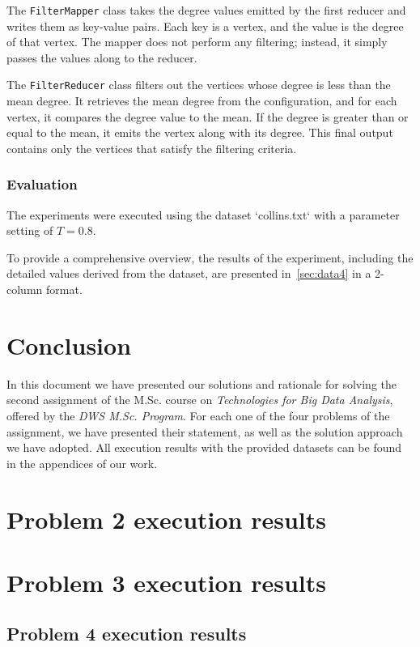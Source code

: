 \documentclass[acmlarge]{acmart}
\begin{document}
The \texttt{FilterMapper} class takes the degree values emitted by the first reducer and writes them as key-value pairs.
Each key is a vertex, and the value is the degree of that vertex.
The mapper does not perform any filtering; instead, it simply passes the values along to the reducer.

The \texttt{FilterReducer} class filters out the vertices whose degree is less than the mean degree.
It retrieves the mean degree from the configuration, and for each vertex, it compares the degree value to the mean.
If the degree is greater than or equal to the mean, it emits the vertex along with its degree.
This final output contains only the vertices that satisfy the filtering criteria.

\subsubsection{Evaluation}
The experiments were executed using the dataset `collins.txt` with a parameter setting of \( T = 0.8 \).

To provide a comprehensive overview, the results of the experiment, including the detailed values derived from the
dataset, are presented in~\autoref{sec:data4} in a 2-column format.



\section{Conclusion}
\label{sec:conclusion}
In this document we have presented our solutions and rationale for solving the second assignment of the M.Sc.
course on \emph{Technologies for Big Data Analysis}, offered by the \emph{DWS M.Sc. Program}. For each one of the four problems of the assignment, we have presented their statement, as well as the solution approach we have adopted. All execution results with the provided datasets can be found in the appendices of our work.

\newpage
\appendix

\section{Problem 2 execution results}
\label{sec:data2}


\section{Problem 3 execution results}
\label{sec:data3}


\subsection{Problem 4 execution results}
\label{sec:data4}

\end{document}

